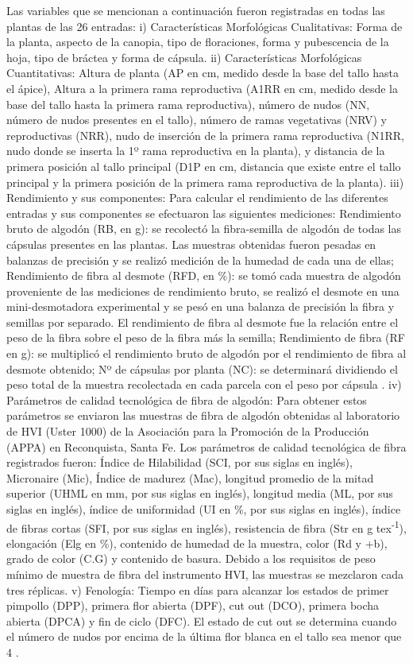 \documentclass[12pt,oneside]{reedthesis}
\begin{document}
Las variables que se mencionan a continuación fueron registradas en todas las plantas de las 26 entradas: i) Características Morfológicas Cualitativas: Forma de la planta, aspecto de la canopia, tipo de floraciones, forma y pubescencia de la hoja, tipo de bráctea y forma de cápsula. ii) Características Morfológicas Cuantitativas: Altura de planta (AP en cm, medido desde la base del tallo hasta el ápice), Altura a la primera rama reproductiva (A1RR en cm, medido desde la base del tallo hasta la primera rama reproductiva), número de nudos (NN, número de nudos presentes en el tallo), número de ramas vegetativas (NRV) y reproductivas (NRR), nudo de inserción de la primera rama reproductiva (N1RR, nudo donde se inserta la 1º rama reproductiva en la planta), y distancia de la primera posición al tallo principal (D1P en cm, distancia que existe entre el tallo principal y la primera posición de la primera rama reproductiva de la planta). iii) Rendimiento y sus componentes: Para calcular el rendimiento de las diferentes entradas y sus componentes se efectuaron las siguientes mediciones: Rendimiento bruto de algodón (RB, en g): se recolectó la fibra-semilla de algodón de todas las cápsulas presentes en las plantas. Las muestras obtenidas fueron pesadas en balanzas de precisión y se realizó medición de la humedad de cada una de ellas; Rendimiento de fibra al desmote (RFD, en \%): se tomó cada muestra de algodón proveniente de las mediciones de rendimiento bruto, se realizó el desmote en una mini-desmotadora experimental y se pesó en una balanza de precisión la fibra y semillas por separado. El rendimiento de fibra al desmote fue la relación entre el peso de la fibra sobre el peso de la fibra más la semilla; Rendimiento de fibra (RF en g): se multiplicó el rendimiento bruto de algodón por el rendimiento de fibra al desmote obtenido; Nº de cápsulas por planta (NC): se determinará dividiendo el peso total de la muestra recolectada en cada parcela con el peso por cápsula \autocite{wells1984}. iv) Parámetros de calidad tecnológica de fibra de algodón: Para obtener estos parámetros se enviaron las muestras de fibra de algodón obtenidas al laboratorio de HVI (Uster 1000) de la Asociación para la Promoción de la Producción (APPA) en Reconquista, Santa Fe. Los parámetros de calidad tecnológica de fibra registrados fueron: Índice de Hilabilidad (SCI, por sus siglas en inglés), Micronaire (Mic), Índice de madurez (Mac), longitud promedio de la mitad superior (UHML en mm, por sus siglas en inglés), longitud media (ML, por sus siglas en inglés), índice de uniformidad (UI en \%, por sus siglas en inglés), índice de fibras cortas (SFI, por sus siglas en inglés), resistencia de fibra (Str en g tex\textsuperscript{-1}), elongación (Elg en \%), contenido de humedad de la muestra, color (Rd y +b), grado de color (C.G) y contenido de basura. Debido a los requisitos de peso mínimo de muestra de fibra del instrumento HVI, las muestras se mezclaron cada tres réplicas. v) Fenología: Tiempo en días para alcanzar los estados de primer pimpollo (DPP), primera flor abierta (DPF), cut out (DCO), primera bocha abierta (DPCA) y fin de ciclo (DFC). El estado de cut out se determina cuando el número de nudos por encima de la última flor blanca en el tallo sea menor que 4 \autocite{bourland1992}.
\end{document}
